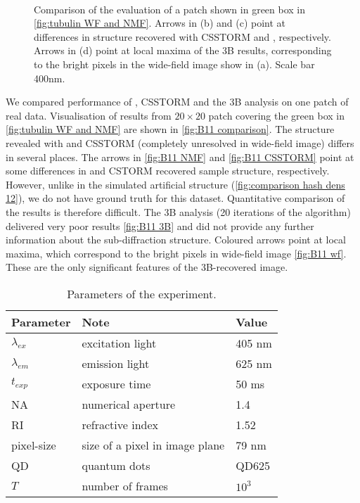 \begin{figure}[!h]
	\centering
	\newcommand{\sizef}{.95}
	\newcommand{\wf}{.45\textwidth}
	\\
	\caption{Comparison of the evaluation of a patch shown in green box in \autoref{fig:tubulin WF and NMF}. Arrows in (b) and (c) point at differences in structure recovered with CSSTORM and \inmf{}, respectively. Arrows in (d) point at local maxima of the 3B results, corresponding to the bright pixels in the wide-field image show in (a). Scale bar 400\unit{nm}.}
	\label{fig:B11 comparison}
\end{figure}

We compared performance of \inmf{}, CSSTORM and the 3B analysis on one patch of real data. Visualisation of results from $20\times20$ patch covering the green box in \autoref{fig:tubulin WF and NMF} are shown in \autoref{fig:B11 comparison}. The structure revealed with \inmf{} and CSSTORM (completely unresolved in wide-field image) differs in several places. The arrows in \autoref{fig:B11 NMF} and \autoref{fig:B11 CSSTORM}  point at some differences in  \inmf{} and CSTORM recovered sample structure, respectively. However, unlike in the simulated artificial structure (\autoref{fig:comparison hash dens 12}), we do not have ground truth for this dataset. Quantitative comparison of the results is therefore difficult. The 3B analysis (20 iterations of the algorithm) delivered very poor results \autoref{fig:B11 3B} and did not provide any further information about the sub-diffraction structure. Coloured arrows point at local maxima, which correspond to the bright pixels in wide-field image \autoref{fig:B11 wf}. These are the only significant features of the 3B-recovered image.

\begin{table}[!h]	
	\centering
	\begin{tabular}{|l|l|l|}	
		\hline \small
		\bf Parameter & \bf Note  & \bf Value\tabularnewline
		\hline
		$\lambda_{ex}$ & excitation light & 405 nm\tabularnewline
		$\lambda_{em}$ & emission light & 625 nm\tabularnewline
		$t_{exp}$ & exposure time  & 50 ms\tabularnewline
		NA & numerical aperture & 1.4\tabularnewline
		RI & refractive index & 1.52\tabularnewline
		pixel-size & size of a pixel in image plane & 79 nm\tabularnewline
		QD & quantum dots  & QD625\tabularnewline
		$T$ & number of frames  & $10^{3}$\tabularnewline
		\hline
	\end{tabular}
	\caption{Parameters of the experiment.}\label{tab:Parameters of the (a) simulations (b) real data}
	\label{tab:parameters experiment}
\end{table}
\afterpage{\clearpage}

